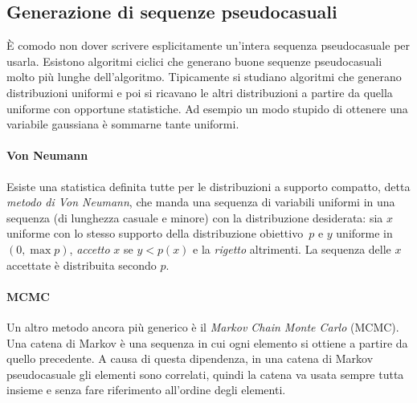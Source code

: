 \subsection{Generazione di sequenze pseudocasuali}

È comodo non dover scrivere esplicitamente un'intera sequenza pseudocasuale per usarla.
Esistono algoritmi ciclici che generano buone sequenze pseudocasuali molto più lunghe dell'algoritmo.
Tipicamente si studiano algoritmi che generano distribuzioni uniformi e poi si ricavano le altri distribuzioni a partire da quella uniforme con opportune statistiche.
Ad esempio un modo stupido di ottenere una variabile gaussiana è sommarne tante uniformi.

\paragraph{Von Neumann}

Esiste una statistica definita tutte per le distribuzioni a supporto compatto,
detta \emph{metodo di Von Neumann},
che manda una sequenza di variabili uniformi in una sequenza (di lunghezza casuale e minore) con la distribuzione desiderata:
sia $x$ uniforme con lo stesso supporto della distribuzione obiettivo~$p$
e $y$ uniforme in $(0,\max p)$, \emph{accetto} $x$ se $y<p(x)$ e la \emph{rigetto} altrimenti.
La sequenza delle $x$ accettate è distribuita secondo $p$.

\paragraph{MCMC}

Un altro metodo ancora più generico è il \emph{Markov Chain Monte Carlo} (MCMC).
Una catena di Markov è una sequenza in cui ogni elemento si ottiene a partire da quello precedente.
A causa di questa dipendenza,
in una catena di Markov pseudocasuale gli elementi sono correlati,
quindi la catena va usata sempre tutta insieme e senza fare riferimento all'ordine degli elementi.

